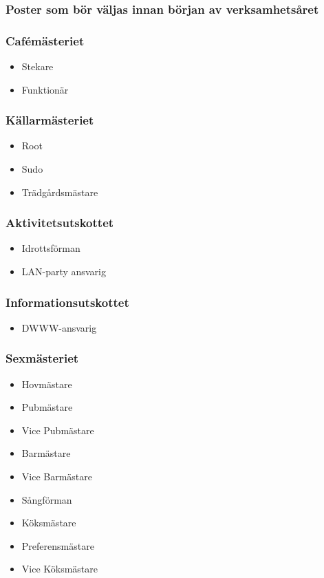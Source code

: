\documentclass{dsekkallelse}
\begin{document}
\subsubsection{Poster som bör väljas innan början av verksamhetsåret}
\begin{multicols}{2}

\subsubsection{Cafémästeriet}
\begin{itemize}
    \item Stekare
    \item Funktionär
\end{itemize}

\subsubsection{Källarmästeriet}
\begin{itemize}
    \item Root
    \item Sudo
    \item Trädgårdsmästare
\end{itemize}

\subsubsection{Aktivitetsutskottet}
\begin{itemize}
    \item Idrottsförman
    \item LAN-party ansvarig
\end{itemize}

\subsubsection{Informationsutskottet}
\begin{itemize}
    \item DWWW-ansvarig
\end{itemize}

\subsubsection{Sexmästeriet}
\begin{itemize}
    \item Hovmästare
    \item Pubmästare
    \item Vice Pubmästare
    \item Barmästare
    \item Vice Barmästare
    \item Sångförman
    \item Köksmästare
    \item Preferensmästare
    \item Vice Köksmästare
\end{itemize}


\end{multicols}
\end{document}
